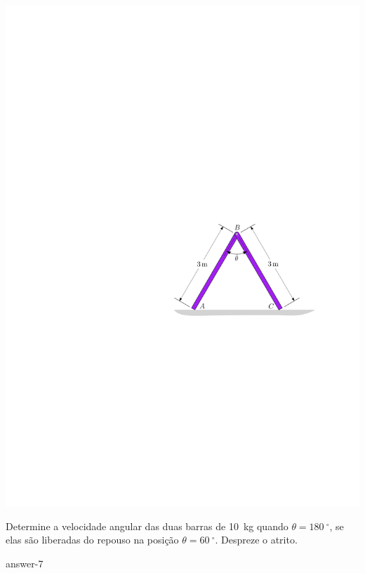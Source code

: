 \begin{minipage}{.6\linewidth}
	\begin{flushright}
		\includegraphics[scale=1.1]{../../images/draw_3_2}
	\end{flushright}
\end{minipage}
\begin{minipage}{.4\linewidth}
	\item Determine a velocidade angular das duas barras de \SI{10}{\kilogram} quando $\theta=\SI{180}{^{\circ}}$, se elas são liberadas do repouso na posição $\theta=\SI{60}{^{\circ}}$. Despreze o atrito.
	
	{answer-7}
\end{minipage}